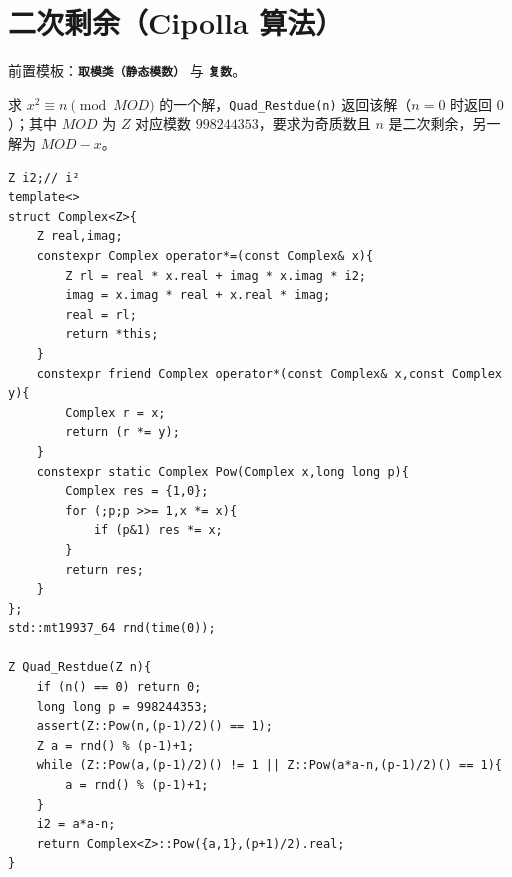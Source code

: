 \section{二次剩余（Cipolla 算法）}

前置模板：\textbf{\texttt{取模类（静态模数）}} 与 \textbf{\texttt{复数}}。

求 $x^2\equiv n\pmod{MOD}$ 的一个解，\verb|Quad_Restdue(n)| 返回该解（$n=0$ 时返回 $0$）；其中 $MOD$ 为 $Z$ 对应模数 $998244353$，要求为奇质数且 $n$ 是二次剩余，另一解为 $MOD-x$。

\begin{lstlisting}
Z i2;// i²
template<>
struct Complex<Z>{
    Z real,imag;
    constexpr Complex operator*=(const Complex& x){
        Z rl = real * x.real + imag * x.imag * i2;
        imag = x.imag * real + x.real * imag;
        real = rl;
        return *this;
    }
    constexpr friend Complex operator*(const Complex& x,const Complex y){
        Complex r = x;
        return (r *= y);
    }
    constexpr static Complex Pow(Complex x,long long p){
        Complex res = {1,0};
        for (;p;p >>= 1,x *= x){
            if (p&1) res *= x;
        }
        return res;
    }
};
std::mt19937_64 rnd(time(0));

Z Quad_Restdue(Z n){
    if (n() == 0) return 0;
    long long p = 998244353;
    assert(Z::Pow(n,(p-1)/2)() == 1);
    Z a = rnd() % (p-1)+1;
    while (Z::Pow(a,(p-1)/2)() != 1 || Z::Pow(a*a-n,(p-1)/2)() == 1){
        a = rnd() % (p-1)+1;
    }
    i2 = a*a-n;
    return Complex<Z>::Pow({a,1},(p+1)/2).real;
}
\end{lstlisting}
